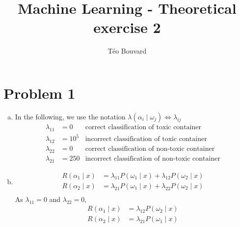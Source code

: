 \documentclass[a4paper, 10pt, twoside]{article}
\begin{document}
\title{Machine Learning - Theoretical exercise 2}
\author{T\'eo Bouvard}
\maketitle

\section*{Problem 1}
\begin{enumerate}[a)]
    \item In the following, we use the notation $\lambda(\alpha_i \mid \omega_j) \Leftrightarrow \lambda_{ij}$
          \begin{align*}
              \lambda_{11} & = 0    & \text{correct classification of toxic container}       \\
              \lambda_{12} & = 10^5 & \text{incorrect classification of toxic container}     \\
              \lambda_{22} & = 0    & \text{correct classification of non-toxic container}   \\
              \lambda_{21} & = 250  & \text{incorrect classification of non-toxic container}
          \end{align*}

    \item
          \begin{align*}
              R(\alpha_1 \mid x) & = \lambda_{11}P(\omega_1 \mid x) + \lambda_{12}P(\omega_2 \mid x) \\
              R(\alpha_2 \mid x) & = \lambda_{21}P(\omega_1 \mid x) + \lambda_{22}P(\omega_2 \mid x) \\
          \end{align*}
          As $\lambda_{11} = 0$ and $\lambda_{22} = 0$,
          \begin{align*}
              R(\alpha_1 \mid x) & = \lambda_{12}P(\omega_2 \mid x) \\
              R(\alpha_2 \mid x) & = \lambda_{21}P(\omega_1 \mid x) \\
          \end{align*}


\end{enumerate}
\end{document}
